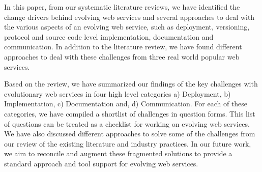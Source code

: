 \documentclass[runningheads,a4paper]{llncs}
\begin{document}
In this paper, from our systematic literature reviews, we have identified the change drivers behind evolving web services and several approaches to deal with the various aspects of an evolving web service, such as deployment, versioning, protocol and source code level implementation, documentation and communication. In addition to the literature review, we have found different approaches to deal with these challenges from three real world popular web services.

Based on the review, we have summarized our findings of the key challenges with evolutionary web services in four high level categories a) Deployment, b) Implementation, c) Documentation and, d) Communication. For each of these categories, we have compiled a shortlist of challenges in question forms. This list of questions can be treated as a checklist for working on evolving web services. We have also discussed different approaches to solve some of the challenges from our review of the existing literature and industry practices. In our future work, we aim to reconcile and augment these fragmented solutions to provide a standard approach and tool support for evolving web services.



\end{document}
